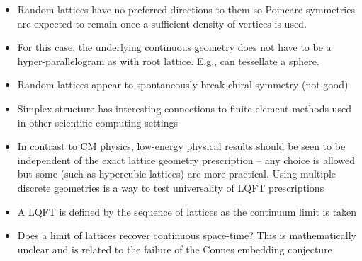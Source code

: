 \begin{itemize}
\begin{itemize}
\end{itemize}

\item Random lattices have no preferred directions to them so Poincare symmetries are expected to remain once a sufficient density of vertices is used.

\item For this case, the underlying continuous geometry does not have to be a hyper-parallelogram as with root lattice. E.g., can tessellate a sphere.

\item Random lattices appear to spontaneously break chiral symmetry (not good)

\item Simplex structure has interesting connections to finite-element methods used in other scientific computing settings

\item In contrast to CM physics, low-energy physical results should be seen to be independent of the exact lattice geometry prescription -- any choice is allowed but some (such as hypercubic lattices) are more practical. Using multiple discrete geometries is a way to test universality of LQFT prescriptions

\item A LQFT is defined by the sequence of lattices as the continuum limit is taken

\item Does a limit of lattices recover continuous space-time? This is mathematically unclear and is related to the failure of the Connes embedding conjecture


\end{itemize}
